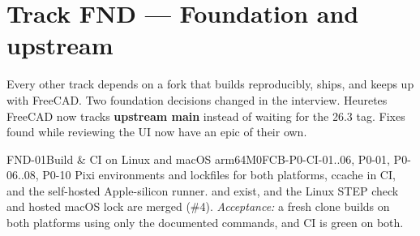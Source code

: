 \section{Track FND --- Foundation and upstream}\label{sec:fnd}

Every other track depends on a fork that builds reproducibly, ships, and keeps up with FreeCAD. Two
foundation decisions changed in the interview. Heuretes FreeCAD now tracks \textbf{upstream main} instead of
waiting for the 26.3 tag. Fixes found while reviewing the UI now have an epic of their own.

\begin{epic}{FND-01}{Build \& CI on Linux and macOS arm64}{M0}{\stProg}{FCB-P0-CI-01..06, P0-01, P0-06..08, P0-10}
Pixi environments and lockfiles for both platforms, ccache in CI, and the self-hosted Apple-silicon runner.
 and  exist, and the Linux STEP check
and hosted macOS lock are merged (\#4).
\emph{Acceptance:} a fresh clone builds on both platforms using only the documented commands, and CI is green
on both.
\end{epic}

